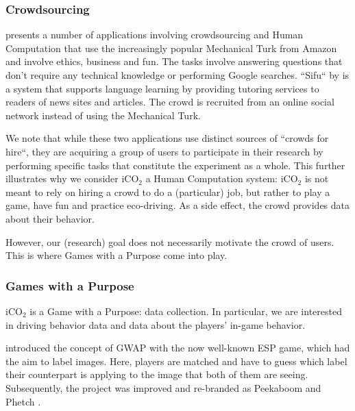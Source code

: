\documentclass[preprint,authoryear,12pt]{elsarticle}
\begin{document}
\subsubsection{Crowdsourcing}


\cite{Biewald:2012} presents a number of applications involving crowdsourcing and Human Computation that use the increasingly popular Mechanical Turk from Amazon \citep{MechTurk} and involve ethics, business and fun. The tasks involve answering questions that don't require any technical knowledge or performing Google searches. ``Sifu`` by \citep{ChanH12} is a system that supports language learning by providing tutoring services to readers of news sites and articles. The crowd is recruited from an online social network instead of using the Mechanical Turk.

We note that while these two applications use distinct sources of ``crowds for hire``, they are acquiring a group of users to participate in their research by performing specific tasks that constitute the experiment as a whole. This further illustrates why we consider iCO$_2$ a Human Computation system: iCO$_2$ is not meant to rely on hiring a crowd to do a (particular) job, but rather to play a game, have fun and practice eco-driving. As a side effect, the crowd provides data about their behavior.

However, our (research) goal does not necessarily motivate the crowd of users. This is where Games with a Purpose come into play.

\subsubsection{Games with a Purpose}

iCO$_2$ is a Game with a Purpose: data collection. In particular, we are interested in driving behavior data and data about the players' in-game behavior.

\cite{vonAhn:2004} introduced the concept of GWAP with the now well-known ESP game, which had the aim to label images. Here, players are matched and have to guess which label their counterpart is applying to the image that both of them are seeing. Subsequently, the project was improved and re-branded as Peekaboom \citep{vonAhn:2006} and Phetch \citep{vonAhn:2007}.

\end{document}
